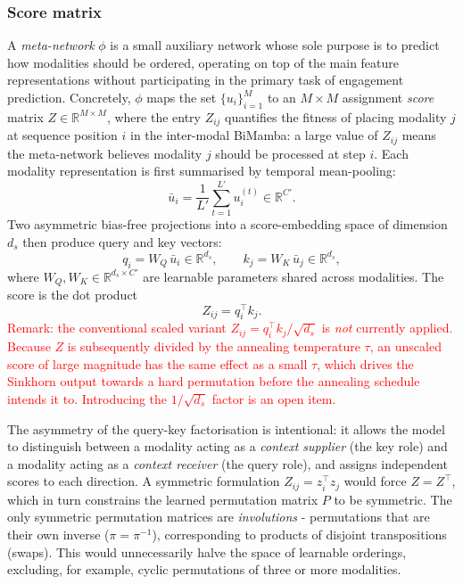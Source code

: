 \documentclass[11pt,a4paper]{article}
\newcommand{\R}{\mathbb{R}}
\begin{document}
	\subsubsection*{Score matrix}
	A \emph{meta-network} $\phi$ is a small auxiliary network whose sole purpose is to predict how modalities should be ordered, operating on top of the main feature representations without participating in the primary task of engagement prediction. Concretely, $\phi$ maps the set $\{u_i\}_{i=1}^M$ to an $M \times M$ assignment \emph{score} matrix $Z \in \R^{M \times M}$, where the entry $Z_{ij}$ quantifies the fitness of placing modality $j$ at sequence position $i$ in the inter-modal BiMamba: a large value of $Z_{ij}$ means the meta-network believes modality $j$ should be processed at step $i$. Each modality representation is first summarised by temporal mean-pooling:
	$$\bar{u}_i = \frac{1}{L'}\sum_{t=1}^{L'} u_i^{(t)} \in \R^{C'}.$$
	Two asymmetric bias-free projections into a score-embedding space of dimension $d_s$ then produce query and key vectors:
	$$q_i = W_Q\,\bar{u}_i \in \R^{d_s}, \qquad k_j = W_K\,\bar{u}_j \in \R^{d_s},$$
	where $W_Q, W_K \in \R^{d_s \times C'}$ are learnable parameters shared across modalities. The score is the dot product
	$$Z_{ij} = q_i^\top k_j .$$
	\textcolor{red}{Remark: the conventional scaled variant $Z_{ij} = q_i^\top k_j / \sqrt{d_s}$ is \emph{not} currently applied. Because $Z$ is subsequently divided by the annealing temperature $\tau$, an unscaled score of large magnitude has the same effect as a small $\tau$, which drives the Sinkhorn output towards a hard permutation before the annealing schedule intends it to. Introducing the $1/\sqrt{d_s}$ factor is an open item.}
	
	The asymmetry of the query-key factorisation is intentional: it allows the model to distinguish between a modality acting as a \emph{context supplier} (the key role) and a modality acting as a \emph{context receiver} (the query role), and assigns independent scores to each direction. A symmetric formulation $Z_{ij} = z_i^\top z_j$ would force $Z = Z^\top$, which in turn constrains the learned permutation matrix $P$ to be symmetric. The only symmetric permutation matrices are \emph{involutions} - permutations that are their own inverse ($\pi = \pi^{-1}$), corresponding to products of disjoint transpositions (swaps). This would unnecessarily halve the space of learnable orderings, excluding, for example, cyclic permutations of three or more modalities.
	
\end{document}

